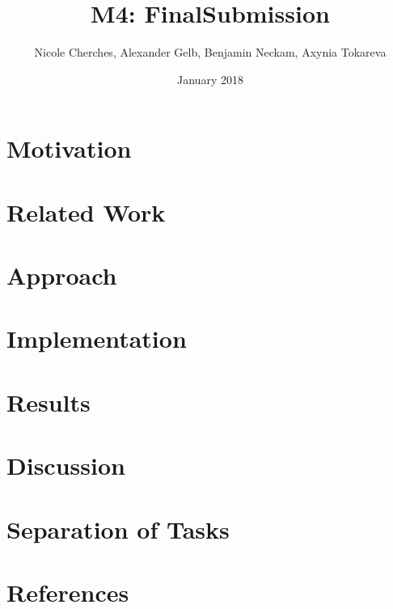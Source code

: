 \documentclass{article}
\title{M4: FinalSubmission}
\author{Nicole Cherches, Alexander Gelb, Benjamin Neckam, Axynia Tokareva}
\date{January 2018}
\begin{document}
\maketitle

\section{Motivation}

\section{Related Work}

\section{Approach}

\section{Implementation}

\section{Results}

\section{Discussion}

\section{Separation of Tasks}

\section{References}
\end{document}
